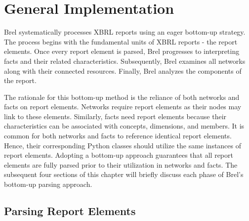 \section{General Implementation}
\label{sec:implementation_general}


Brel systematically processes XBRL reports using an eager bottom-up strategy.
The process begins with the fundamental units of XBRL reports - the report elements.
Once every report element is parsed, Brel progresses to interpreting facts and their related characteristics.
Subsequently, Brel examines all networks along with their connected resources.
Finally, Brel analyzes the components of the report.

The rationale for this bottom-up method is the reliance of both networks and facts on report elements.
Networks require report elements as their nodes may link to these elements.
Similarly, facts need report elements because their characteristics can be associated with concepts, dimensions, and members.
It is common for both networks and facts to reference identical report elements.
Hence, their corresponding Python classes should utilize the same instances of report elements.
Adopting a bottom-up approach guarantees that all report elements are fully parsed prior to their utilization in networks and facts.
The subsequent four sections of this chapter will briefly discuss each phase of Brel's bottom-up parsing approach.

\subsection{Parsing Report Elements}
\label{sec:implementation_report_elements}

